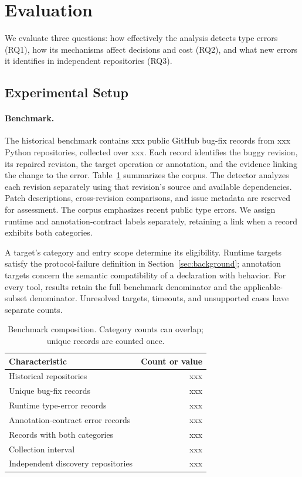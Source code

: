 \section{Evaluation}
\label{sec:evaluation}
We evaluate three questions: how effectively the analysis detects type
errors (RQ1), how its mechanisms affect decisions and cost (RQ2), and what
new errors it identifies in independent repositories (RQ3).

\subsection{Experimental Setup}
\label{sec:setup}
\paragraph{Benchmark.}
The historical benchmark contains xxx public GitHub bug-fix records from
xxx Python repositories, collected over xxx. Each record identifies the
buggy revision, its repaired revision, the target operation or annotation,
and the evidence linking the change to the error. Table~\ref{tab:dataset}
summarizes the corpus. The detector analyzes each revision separately using that revision's
source and available dependencies. Patch descriptions, cross-revision
comparisons, and issue metadata are reserved for assessment. The corpus emphasizes recent public type errors. We assign
runtime and annotation-contract labels separately, retaining a link when
a record exhibits both categories.

A target's category and entry scope determine its eligibility. Runtime
targets satisfy the protocol-failure definition in Section~\ref{sec:background};
annotation targets concern the semantic compatibility of a declaration
with behavior. For every tool, results retain the full benchmark denominator
and the applicable-subset denominator. Unresolved targets, timeouts, and
unsupported cases have separate counts.

\begin{table}[t]
\centering
\caption{Benchmark composition. Category counts can overlap; unique records are counted once.}
\label{tab:dataset}
\begin{tabular}{lr}
\toprule
Characteristic & Count or value\\
\midrule
Historical repositories & xxx\\
Unique bug-fix records & xxx\\
Runtime type-error records & xxx\\
Annotation-contract error records & xxx\\
Records with both categories & xxx\\
Collection interval & xxx\\
Independent discovery repositories & xxx\\
\bottomrule
\end{tabular}
\end{table}

